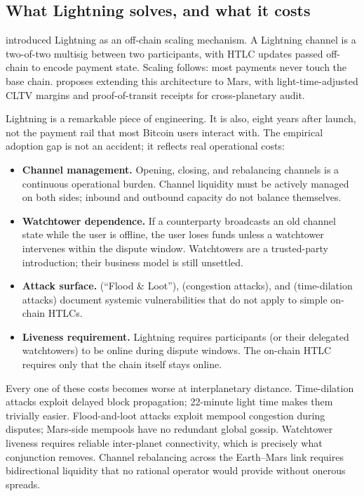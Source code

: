 \documentclass[11pt]{article}
\begin{document}
\subsection{What Lightning solves, and what it costs}

\citet{poon2016lightning} introduced Lightning as an off-chain scaling mechanism. A Lightning channel is a two-of-two multisig between two participants, with HTLC updates passed off-chain to encode payment state. Scaling follows: most payments never touch the base chain. \citet{puente2025} proposes extending this architecture to Mars, with light-time-adjusted CLTV margins and proof-of-transit receipts for cross-planetary audit.

Lightning is a remarkable piece of engineering. It is also, eight years after launch, not the payment rail that most Bitcoin users interact with. The empirical adoption gap is not an accident; it reflects real operational costs:

\begin{itemize}
  \item \textbf{Channel management.} Opening, closing, and rebalancing channels is a continuous operational burden. Channel liquidity must be actively managed on both sides; inbound and outbound capacity do not balance themselves.
  \item \textbf{Watchtower dependence.} If a counterparty broadcasts an old channel state while the user is offline, the user loses funds unless a watchtower intervenes within the dispute window. Watchtowers are a trusted-party introduction; their business model is still unsettled.
  \item \textbf{Attack surface.} \citet{harris2020flood} (``Flood \& Loot''), \citet{mizrahi2021griefing} (congestion attacks), and \citet{riard2021time} (time-dilation attacks) document systemic vulnerabilities that do not apply to simple on-chain HTLCs.
  \item \textbf{Liveness requirement.} Lightning requires participants (or their delegated watchtowers) to be online during dispute windows. The on-chain HTLC requires only that the chain itself stays online.
\end{itemize}

Every one of these costs becomes worse at interplanetary distance. Time-dilation attacks exploit delayed block propagation; 22-minute light time makes them trivially easier. Flood-and-loot attacks exploit mempool congestion during disputes; Mars-side mempools have no redundant global gossip. Watchtower liveness requires reliable inter-planet connectivity, which is precisely what conjunction removes. Channel rebalancing across the Earth--Mars link requires bidirectional liquidity that no rational operator would provide without onerous spreads.
\end{document}
